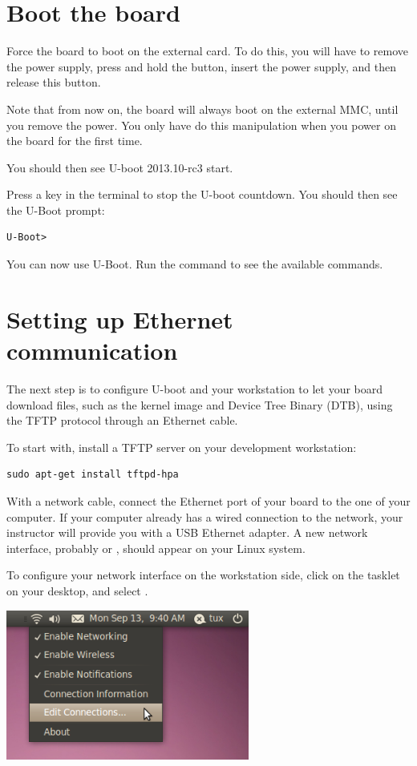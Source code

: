 \section{Boot the board}

Force the board to boot on the external card. To do this, you will
have to remove the power supply, press and hold the 
button, insert the power supply, and then release this button.

Note that from now on, the board will always boot on the external 
MMC, until you remove the power. You only have do this manipulation
when you power on the board for the first time.

You should then see U-boot 2013.10-rc3 start.

Press a key in the  terminal to stop the U-boot
countdown. You should then see the U-Boot prompt:
\begin{verbatim}
U-Boot>
\end{verbatim}

You can now use U-Boot. Run the  command to see the available
commands.

\section{Setting up Ethernet communication}

The next step is to configure U-boot and your workstation to let your
board download files, such as the kernel image and Device Tree Binary
(DTB), using the TFTP protocol through an Ethernet cable.

To start with, install a TFTP server on your development workstation:

\begin{verbatim}
sudo apt-get install tftpd-hpa
\end{verbatim}

With a network cable, connect the Ethernet port of your board to the
one of your computer. If your computer already has a wired connection
to the network, your instructor will provide you with a USB Ethernet
adapter. A new network interface, probably  or ,
should appear on your Linux system.

To configure your network interface on the workstation side, click on
the  tasklet on your desktop, and select
.

\begin{center}
\includegraphics[width=8cm]{labs/kernel-board-setup/network-config-1.png}
\end{center}

